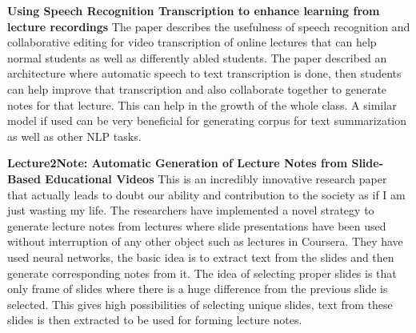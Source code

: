 \documentclass[11pt,a4paper]{article}
\begin{document}
	\textbf{Using Speech Recognition Transcription to enhance learning from lecture recordings}\citep{soton419608}
  The paper describes the usefulness of speech recognition and collaborative  editing for video transcription of online lectures that can help normal students as well as differently abled students. The paper described an architecture where automatic speech to text transcription is done, then students can help improve that transcription and also collaborate together to generate notes for that lecture. This can help in the growth of the whole class. A similar model if used can be very beneficial for generating corpus for text summarization as well as other NLP tasks.
  
  \textbf{Lecture2Note: Automatic Generation of Lecture Notes from Slide-Based Educational Videos}\citep{xu2019lecture2note}
  This is an incredibly innovative research paper that actually leads to doubt our ability and contribution to the society as if I am just wasting my life. The researchers have implemented a novel strategy to generate lecture notes from lectures where slide presentations have been used without interruption of any other object such as lectures in Coursera. They have used neural networks, the basic idea is to extract text from the slides and then generate corresponding notes from it. The idea of selecting proper slides is that only frame of slides where there is a huge difference from the previous slide is selected. This gives high possibilities of selecting unique slides, text from these slides is then extracted to be used for forming lecture notes.
  
\end{document}
